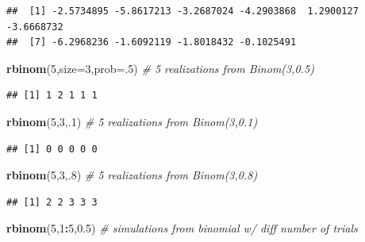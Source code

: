 \documentclass[]{article}
\newenvironment{Shaded}{\begin{snugshade}}{\end{snugshade}}
\newcommand{\KeywordTok}[1]{\textcolor[rgb]{0.13,0.29,0.53}{\textbf{#1}}}
\newcommand{\DataTypeTok}[1]{\textcolor[rgb]{0.13,0.29,0.53}{#1}}
\newcommand{\DecValTok}[1]{\textcolor[rgb]{0.00,0.00,0.81}{#1}}
\newcommand{\FloatTok}[1]{\textcolor[rgb]{0.00,0.00,0.81}{#1}}
\newcommand{\CommentTok}[1]{\textcolor[rgb]{0.56,0.35,0.01}{\textit{#1}}}
\newcommand{\OperatorTok}[1]{\textcolor[rgb]{0.81,0.36,0.00}{\textbf{#1}}}
\newcommand{\NormalTok}[1]{#1}
\begin{document}
\begin{verbatim}
##  [1] -2.5734895 -5.8617213 -3.2687024 -4.2903868  1.2900127 -3.6668732
##  [7] -6.2968236 -1.6092119 -1.8018432 -0.1025491
\end{verbatim}

\begin{Shaded}
\begin{Highlighting}[]
\KeywordTok{rbinom}\NormalTok{(}\DecValTok{5}\NormalTok{,}\DataTypeTok{size=}\DecValTok{3}\NormalTok{,}\DataTypeTok{prob=}\NormalTok{.}\DecValTok{5}\NormalTok{)                }\CommentTok{# 5 realizations from Binom(3,0.5)}
\end{Highlighting}
\end{Shaded}

\begin{verbatim}
## [1] 1 2 1 1 1
\end{verbatim}

\begin{Shaded}
\begin{Highlighting}[]
\KeywordTok{rbinom}\NormalTok{(}\DecValTok{5}\NormalTok{,}\DecValTok{3}\NormalTok{,.}\DecValTok{1}\NormalTok{)                }\CommentTok{# 5 realizations from Binom(3,0.1)}
\end{Highlighting}
\end{Shaded}

\begin{verbatim}
## [1] 0 0 0 0 0
\end{verbatim}

\begin{Shaded}
\begin{Highlighting}[]
\KeywordTok{rbinom}\NormalTok{(}\DecValTok{5}\NormalTok{,}\DecValTok{3}\NormalTok{,.}\DecValTok{8}\NormalTok{)                }\CommentTok{# 5 realizations from Binom(3,0.8)}
\end{Highlighting}
\end{Shaded}

\begin{verbatim}
## [1] 2 2 3 3 3
\end{verbatim}

\begin{Shaded}
\begin{Highlighting}[]
\KeywordTok{rbinom}\NormalTok{(}\DecValTok{5}\NormalTok{,}\DecValTok{1}\OperatorTok{:}\DecValTok{5}\NormalTok{,}\FloatTok{0.5}\NormalTok{)       }\CommentTok{# simulations from binomial w/ diff number of trials}
\end{Highlighting}
\end{Shaded}
\end{document}
